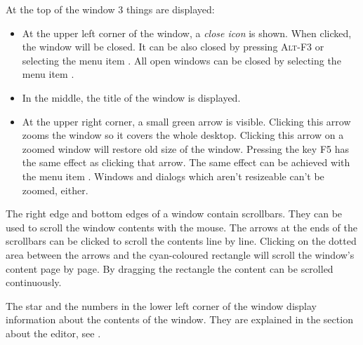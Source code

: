 At the top of the window 3 things are displayed:
\begin{itemize}
\item 
At the upper left corner of the window, a \emph{close icon} is shown. 
When clicked, the window will be closed. It can be also closed by
 pressing \textsc{Alt-F3} or selecting the menu item . 
All open windows can be closed by selecting the menu item 
.
\item In the middle, the title of the window is displayed.
\item At the upper right corner, a small green arrow is visible.
Clicking this arrow zooms the window so it covers the whole desktop. 
Clicking this arrow on a zoomed window will restore old size of the 
window. Pressing the key \textsc{F5} has the same effect as clicking 
that arrow. The same effect can be achieved with the menu item .
Windows and dialogs which aren't resizeable can't be zoomed, either.
\end{itemize}

The right edge and bottom edges of a window contain scrollbars.
They can be used to scroll the window contents with the mouse. 
The arrows at the ends of the scrollbars can be clicked to scroll the 
contents line by line. Clicking on the dotted area between the arrows 
and the cyan-coloured rectangle will scroll the window's content 
page by page. By dragging the rectangle the content can be scrolled 
continuously.

The star and the numbers in the lower left corner of the window
display information about the contents of the window. They
are explained in the section about the editor, see .

%
%
